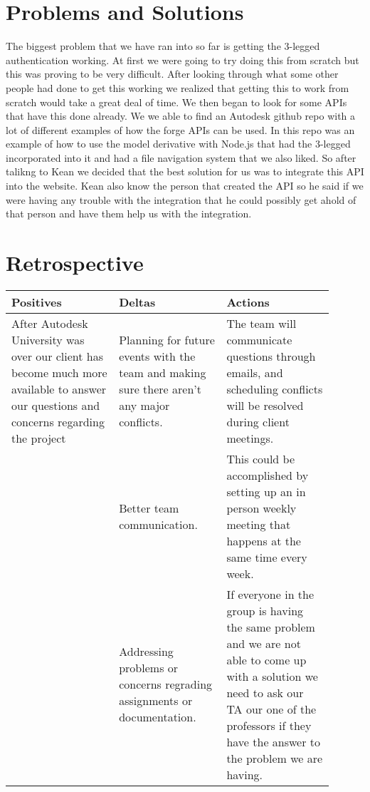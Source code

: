 \documentclass[10pt,draftclsnofoot,onecolumn]{IEEEtran}
\begin{document}
\section{Problems and Solutions}
The biggest problem that we have ran into so far is getting the 3-legged authentication working. At first we were going to try doing this from scratch but this was proving to be very difficult. After looking through what some other people had done to get this working we realized that getting this to work from scratch would take a great deal of time. We then began to look for some APIs that have this done already. We we able to find an Autodesk github repo with a lot of different examples of how the forge APIs can be used. In this repo was an example of how to use the model derivative with Node.js that had the 3-legged incorporated into it and had a file navigation system that we also liked. So after talikng to Kean we decided that the best solution for us was to integrate this API into the website. Kean also know the person that created the API so he said if we were having any trouble with the integration that he could possibly get ahold of that person and have them help us with the integration.



\section{Retrospective}

\begin{center}
\begin{tabular}{ |p{0.3\linewidth}|p{0.3\linewidth}|p{0.3\linewidth}| } 
 \hline
 \textbf{Positives} & Deltas & Actions \\ 
\hline
After Autodesk University was over our client has become much more available to answer our questions and concerns regarding the project & Planning for future events with the team and making sure there aren't any major conflicts. & The team will communicate questions through emails, and scheduling conflicts will be resolved during client meetings. \\
\hline
  & Better team communication. & This could be accomplished by setting up an in person weekly meeting that happens at the same time every week. \\
\hline 
  & Addressing problems or concerns regrading assignments or documentation. & If everyone in the group is having the same problem and we are not able to come up with a solution we need to ask our TA our one of the professors if they have the answer to the problem we are having. \\ 
 \hline
\end{tabular}
\end{center}
\end{document}
